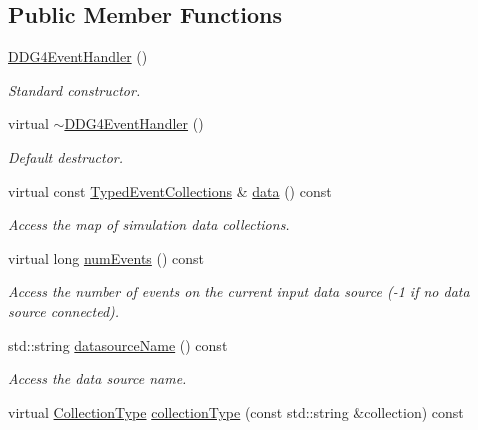 \subsection*{Public Member Functions}
\begin{DoxyCompactItemize}
\item 
\hyperlink{class_d_d4hep_1_1_d_d_g4_event_handler_af3bf78e2d9ae9789b6e9a0ff8c332a07}{DDG4EventHandler} ()
\begin{DoxyCompactList}\small\item\em Standard constructor. \item\end{DoxyCompactList}\item 
virtual \hyperlink{class_d_d4hep_1_1_d_d_g4_event_handler_a149942eb56e028c4f5ea9f814e6dbd3b}{$\sim$DDG4EventHandler} ()
\begin{DoxyCompactList}\small\item\em Default destructor. \item\end{DoxyCompactList}\item 
virtual const \hyperlink{class_d_d4hep_1_1_event_handler_a4d441ff8a824b1e2f278e8b7a6391af3}{TypedEventCollections} \& \hyperlink{class_d_d4hep_1_1_d_d_g4_event_handler_a066893cdf431bef4b398b58624aab22c}{data} () const 
\begin{DoxyCompactList}\small\item\em Access the map of simulation data collections. \item\end{DoxyCompactList}\item 
virtual long \hyperlink{class_d_d4hep_1_1_d_d_g4_event_handler_a0c0858e77b1bb47621738694c31d5ed6}{numEvents} () const 
\begin{DoxyCompactList}\small\item\em Access the number of events on the current input data source (-\/1 if no data source connected). \item\end{DoxyCompactList}\item 
std::string \hyperlink{class_d_d4hep_1_1_d_d_g4_event_handler_ab5f21b250f691a4dae9b1a1deca61440}{datasourceName} () const 
\begin{DoxyCompactList}\small\item\em Access the data source name. \item\end{DoxyCompactList}\item 
virtual \hyperlink{class_d_d4hep_1_1_event_handler_a0b22a141a019364495835317fad48254}{CollectionType} \hyperlink{class_d_d4hep_1_1_d_d_g4_event_handler_a598b723bc7b7783532343403d6b91ff2}{collectionType} (const std::string \&collection) const 

\end{DoxyCompactItemize}
